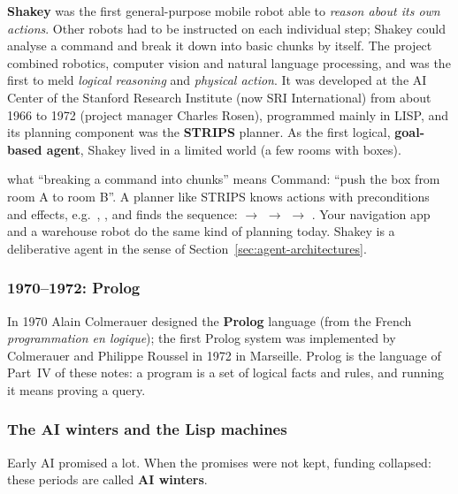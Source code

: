 \textbf{Shakey} was the first general-purpose mobile robot able to \emph{reason about its own
actions}. Other robots had to be instructed on each individual step; Shakey could analyse a
command and break it down into basic chunks by itself. The project combined robotics,
computer vision and natural language processing, and was the first to meld \emph{logical
reasoning} and \emph{physical action}. It was developed at the AI Center of the Stanford
Research Institute (now SRI International) from about 1966 to 1972 (project manager Charles
Rosen), programmed mainly in LISP, and its planning component was the \textbf{STRIPS}
planner. As the first logical, \textbf{goal-based agent}, Shakey lived in a limited world
(a few rooms with boxes).

\begin{nbexample}{what ``breaking a command into chunks'' means}
\notinslides
Command: ``push the box from room A to room B''. A planner like STRIPS knows actions with
preconditions and effects, e.g.\ , , and finds
the sequence:  $\to$  $\to$
 $\to$ . Your navigation app
and a warehouse robot do the same kind of planning today. Shakey is a deliberative agent
in the sense of Section~\ref{sec:agent-architectures}.
\end{nbexample}

\subsubsection{1970--1972: Prolog}

In 1970 Alain Colmerauer designed the \textbf{Prolog} language (from the French
\emph{programmation en logique}); the first Prolog system was implemented by Colmerauer and Philippe Roussel in 1972
in Marseille. Prolog is the language of Part~IV of these notes: a program is a set of
logical facts and rules, and running it means proving a query.

\subsubsection{The AI winters and the Lisp machines}

Early AI promised a lot. When the promises were not kept, funding collapsed: these periods
are called \textbf{AI winters}.

